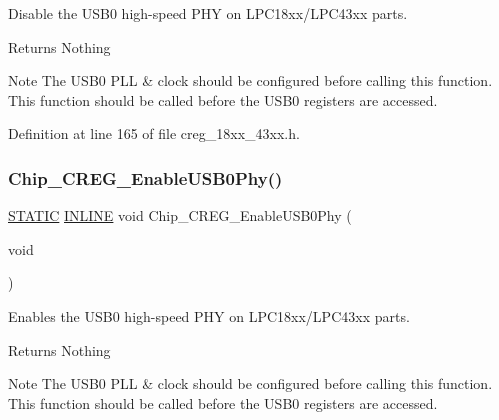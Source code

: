 Disable the U\+S\+B0 high-\/speed P\+HY on L\+P\+C18xx/\+L\+P\+C43xx parts. 

\begin{DoxyReturn}{Returns}
Nothing 
\end{DoxyReturn}
\begin{DoxyNote}{Note}
The U\+S\+B0 P\+LL \& clock should be configured before calling this function. This function should be called before the U\+S\+B0 registers are accessed. 
\end{DoxyNote}


Definition at line 165 of file creg\+\_\+18xx\+\_\+43xx.\+h.

\mbox{\label{group___c_r_e_g__18_x_x__43_x_x_gad0c399884bc0c82c8f38832eb7dee9c9}} 
\subsubsection{\texorpdfstring{Chip\+\_\+\+C\+R\+E\+G\+\_\+\+Enable\+U\+S\+B0\+Phy()}{Chip\_CREG\_EnableUSB0Phy()}}
{\footnotesize\ttfamily \hyperlink{group___l_p_c___types___public___macros_ga10b2d890d871e1489bb02b7e70d9bdfb}{S\+T\+A\+T\+IC} \hyperlink{spifi__18xx__43xx_8h_a2eb6f9e0395b47b8d5e3eeae4fe0c116}{I\+N\+L\+I\+NE} void Chip\+\_\+\+C\+R\+E\+G\+\_\+\+Enable\+U\+S\+B0\+Phy (\begin{DoxyParamCaption}\item[{void}]{ }\end{DoxyParamCaption})}



Enables the U\+S\+B0 high-\/speed P\+HY on L\+P\+C18xx/\+L\+P\+C43xx parts. 

\begin{DoxyReturn}{Returns}
Nothing 
\end{DoxyReturn}
\begin{DoxyNote}{Note}
The U\+S\+B0 P\+LL \& clock should be configured before calling this function. This function should be called before the U\+S\+B0 registers are accessed. 
\end{DoxyNote}



